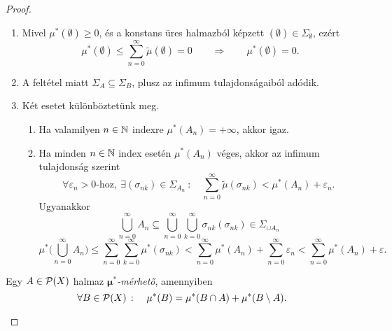 \documentclass[
]{elteikthesis}[2024/04/26]
\begin{document}
\begin{proof}
\begin{proof*}
\begin{enumerate}
				\item 
				Mivel \( \mu^*(\emptyset) \geq 0 \), és a konstans üres halmazból képzett \( (\emptyset) \in \Sigma_\emptyset \), ezért
				\[
					\mu^*(\emptyset) \leq \sum_{n=0}^{\infty} \widetilde{\mu}( \emptyset ) = 0
					\qquad \Longrightarrow \qquad
					\mu^*(\emptyset) = 0.
				\]
				
				\item
				A feltétel miatt \( \Sigma_A \subseteq \Sigma_B \), 
				plusz az infimum tulajdonságaiból adódik.
				
				\item Két esetet különböztetünk meg.
				\begin{enumerate}
					\item 
					Ha valamilyen \( n \in \mathbb{N} \) indexre \(  \mu^*(A_n) = +\infty \), akkor igaz.
					
					\item 
					Ha minden \( n \in \mathbb{N} \) index esetén \( \mu^*(A_n) \) véges, 
					akkor az infimum tulajdonság szerint
					\[
						\forall \varepsilon_n > 0 \text{-hoz}, \
						\exists ( \sigma_{nk} ) \in \Sigma_{A_n} \ \colon \quad
						\sum_{n=0}^{\infty} \widetilde{ \mu }( \sigma_{nk} ) < \mu^*(A_n) + \varepsilon_n.
					\]
					Ugyanakkor
					\[
						\bigcup_{n=0}^{\infty} A_n \subseteq 
						\bigcup_{n=0}^{\infty} \bigcup_{k=0}^{\infty} \sigma_{nk}
						(\sigma_{nk}) \in \Sigma_{\cup A_n }
					\]
					\[
						\mu^* \Biggl( \bigcup_{n=0}^{\infty} A_n \Biggr) \leq
						\sum_{n=0}^{\infty} \sum_{k=0}^{\infty} \mu^*( \sigma_{nk} ) < 
						\sum_{n=0}^{\infty} \mu^*( A_n ) + 
						\sum_{n=0}^{\infty} \varepsilon_n < 
						\sum_{n=0}^{\infty} \mu^*( A_n ) + \varepsilon.
					\]
				\end{enumerate}
			\end{enumerate}
		\end{proof*}
		
		\begin{tcolorbox}[colback=yellow!30, colframe=yellow!80]
			\begin{def*}
				Egy \( A \in \mathcal{P}( X ) \) halmaz \emph{\( \boldsymbol{\mu^*} \)-mérhető}, amennyiben
				\[
					\forall B \in \powerset{X} \ \colon \quad
					\mu^*(B) = \mu^*(B \cap A) + \mu^*(B \setminus A).
				\]
			\end{def*}
		\end{tcolorbox}
		

\end{proof}
\end{document}
